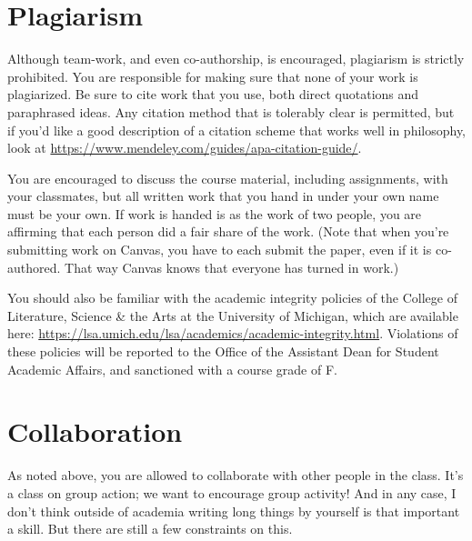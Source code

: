 \documentclass[
  12pt,
  letterpaper,
  DIV=11,
  numbers=noendperiod]{scrartcl}
\begin{document}
\section{Plagiarism}\label{plagiarism}

Although team-work, and even co-authorship, is encouraged, plagiarism is
strictly prohibited. You are responsible for making sure that none of
your work is plagiarized. Be sure to cite work that you use, both direct
quotations and paraphrased ideas. Any citation method that is tolerably
clear is permitted, but if you'd like a good description of a citation
scheme that works well in philosophy, look at
\url{https://www.mendeley.com/guides/apa-citation-guide/}.

You are encouraged to discuss the course material, including
assignments, with your classmates, but all written work that you hand in
under your own name must be your own. If work is handed is as the work
of two people, you are affirming that each person did a fair share of
the work. (Note that when you're submitting work on Canvas, you have to
each submit the paper, even if it is co-authored. That way Canvas knows
that everyone has turned in work.)

You should also be familiar with the academic integrity policies of the
College of Literature, Science \& the Arts at the University of
Michigan, which are available here:
\url{https://lsa.umich.edu/lsa/academics/academic-integrity.html}.
Violations of these policies will be reported to the Office of the
Assistant Dean for Student Academic Affairs, and sanctioned with a
course grade of F.

\section{Collaboration}\label{collaboration}

As noted above, you are allowed to collaborate with other people in the
class. It's a class on group action; we want to encourage group
activity! And in any case, I don't think outside of academia writing
long things by yourself is that important a skill. But there are still a
few constraints on this.
\end{document}
